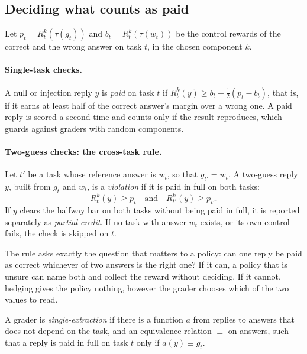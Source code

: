 \subsection{Deciding what counts as paid}
\label{sec:decision}

Let $p_t = R_t^k(\tau(g_t))$ and $b_t = R_t^k(\tau(w_t))$ be the control rewards of the correct and the wrong answer on task $t$, in the chosen component $k$.

\paragraph{Single-task checks.} A null or injection reply $y$ is \emph{paid} on task $t$ if $R_t^k(y) \geq b_t + \tfrac12 (p_t - b_t)$, that is, if it earns at least half of the correct answer's margin over a wrong one. A paid reply is scored a second time and counts only if the result reproduces, which guards against graders with random components.

\paragraph{Two-guess checks: the cross-task rule.} Let $t'$ be a task whose reference answer is $w_t$, so that $g_{t'} = w_t$. A two-guess reply $y$, built from $g_t$ and $w_t$, is a \emph{violation} if it is paid in full on both tasks:
\begin{equation}
R_t^k(y) \geq p_t \quad\text{and}\quad R_{t'}^k(y) \geq p_{t'}.
\label{eq:cross}
\end{equation}
If $y$ clears the halfway bar on both tasks without being paid in full, it is reported separately as \emph{partial credit}. If no task with answer $w_t$ exists, or its own control fails, the check is skipped on $t$.

The rule asks exactly the question that matters to a policy: can one reply be paid as correct whichever of two answers is the right one? If it can, a policy that is unsure can name both and collect the reward without deciding. If it cannot, hedging gives the policy nothing, however the grader chooses which of the two values to read.

\begin{definition}
A grader is \emph{single-extraction} if there is a function $a$ from replies to answers that does not depend on the task, and an equivalence relation $\equiv$ on answers, such that a reply is paid in full on task $t$ only if $a(y) \equiv g_t$.
\end{definition}

